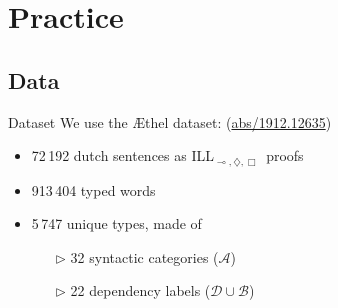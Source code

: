 \documentclass{beamer}
\newcommand{\mill}{ILL${}_{\multimap,\diamondsuit,\Box}$}
\begin{document}
\section{Practice}
\subsection{Data}
\begin{frame}{Dataset}
	\small
	We use the \AE thel dataset: \hfill{\footnotesize(\href{https://arxiv.org/abs/1912.12635}{abs/1912.12635})}
	\begin{itemize}
		\item 72\,192 dutch sentences as \mill\ proofs
		\item 913\,404 typed words
		\item 5\,747 unique types, made of
		\begin{itemize}
			\item[$\triangleright$] 32 syntactic categories ($\mathcal{A}$)
			\item[$\triangleright$] 22 dependency labels ($\mathcal{D}\cup\mathcal{B}$)
		\end{itemize}
	\end{itemize}
\end{frame}
\end{document}
